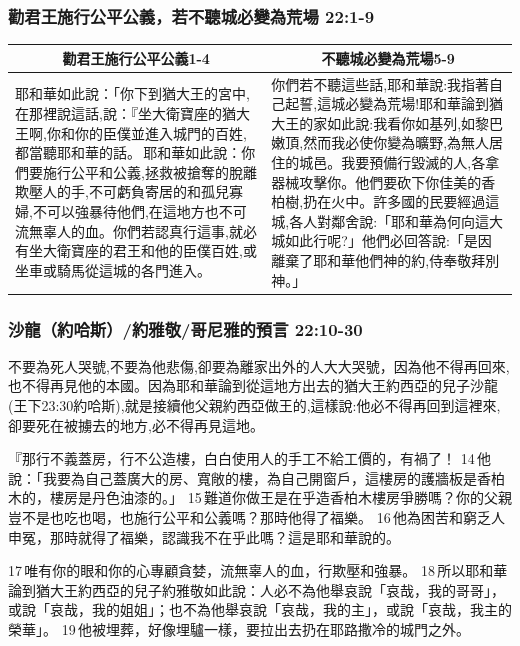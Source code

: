 \subsubsection{勸君王施行公平公義，若不聽城必變為荒場 22:1-9}
\begin{table}[H]
\centering
\begin{tabular}{p{}|p{8cm}}\hline\hline
\multicolumn{1}{c|}{勸君王施行公平公義1-4}&\multicolumn{1}{c|}{不聽城必變為荒場5-9}\\\hline
耶和華如此說：「你下到猶大王的宮中,在那裡說這話,說：『坐大衛寶座的猶大王啊,你和你的臣僕並進入城門的百姓,都當聽耶和華的話。 耶和華如此說：你們要施行公平和公義,拯救被搶奪的脫離欺壓人的手,不可虧負寄居的和孤兒寡婦,不可以強暴待他們,在這地方也不可流無辜人的血。你們若認真行這事,就必有坐大衛寶座的君王和他的臣僕百姓,或坐車或騎馬從這城的各門進入。
&你們若不聽這些話,耶和華說:我指著自己起誓,這城必變為荒場!耶和華論到猶大王的家如此說:我看你如基列,如黎巴嫩頂,然而我必使你變為曠野,為無人居住的城邑。我要預備行毀滅的人,各拿器械攻擊你。他們要砍下你佳美的香柏樹,扔在火中。許多國的民要經過這城,各人對鄰舍說:「耶和華為何向這大城如此行呢?」他們必回答說:「是因離棄了耶和華他們神的約,侍奉敬拜別神。」\\\hline
\end{tabular}
\end{table}


\subsubsection{沙龍（約哈斯）/約雅敬/哥尼雅的預言 22:10-30}
不要為死人哭號,不要為他悲傷,卻要為離家出外的人大大哭號，因為他不得再回來,也不得再見他的本國。因為耶和華論到從這地方出去的猶大王約西亞的兒子沙龍(王下23:30約哈斯),就是接續他父親約西亞做王的,這樣說:他必不得再回到這裡來,卻要死在被擄去的地方,必不得再見這地。

『那行不義蓋房，行不公造樓，白白使用人的手工不給工價的，有禍了！ 14 他說：「我要為自己蓋廣大的房、寬敞的樓，為自己開窗戶，這樓房的護牆板是香柏木的，樓房是丹色油漆的。」 15 難道你做王是在乎造香柏木樓房爭勝嗎？你的父親豈不是也吃也喝，也施行公平和公義嗎？那時他得了福樂。 16 他為困苦和窮乏人申冤，那時就得了福樂，認識我不在乎此嗎？這是耶和華說的。

17 唯有你的眼和你的心專顧貪婪，流無辜人的血，行欺壓和強暴。 18 所以耶和華論到猶大王約西亞的兒子約雅敬如此說：人必不為他舉哀說「哀哉，我的哥哥」，或說「哀哉，我的姐姐」；也不為他舉哀說「哀哉，我的主」，或說「哀哉，我主的榮華」。 19 他被埋葬，好像埋驢一樣，要拉出去扔在耶路撒冷的城門之外。

